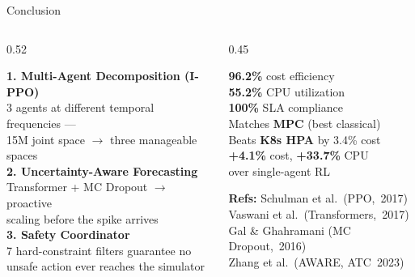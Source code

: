 \documentclass[aspectratio=169,10pt]{beamer}
\begin{document}
\begin{frame}{Conclusion}
\begin{columns}[T]
\begin{column}{0.52\textwidth}
\begin{tcolorbox}[mybox, title={Three Contributions}]
\small
\textbf{1. Multi-Agent Decomposition (I-PPO)}\\
\footnotesize 3 agents at different temporal frequencies ---\\
15M joint space $\to$ three manageable spaces\\[5pt]
\small \textbf{2. Uncertainty-Aware Forecasting}\\
\footnotesize Transformer + MC Dropout $\to$ proactive\\
scaling before the spike arrives\\[5pt]
\small \textbf{3. Safety Coordinator}\\
\footnotesize 7 hard-constraint filters guarantee no\\
unsafe action ever reaches the simulator
\end{tcolorbox}
\end{column}
\begin{column}{0.45\textwidth}
\vspace{0.2cm}
\begin{tcolorbox}[accentbox]
\small
\textbf{96.2\%} cost efficiency\\
\textbf{55.2\%} CPU utilization\\
\textbf{100\%} SLA compliance\\[5pt]
Matches \textbf{MPC} (best classical)\\
Beats \textbf{K8s HPA} by 3.4\% cost\\
\textbf{+4.1\%} cost, \textbf{+33.7\%} CPU\\
over single-agent RL
\end{tcolorbox}
\vspace{0.2cm}
\begin{tcolorbox}[warnbox]
\small \textbf{Refs:} Schulman et al.\ (PPO,~2017)\\
Vaswani et al.\ (Transformers,~2017)\\
Gal \& Ghahramani (MC Dropout,~2016)\\
Zhang et al.\ (AWARE, ATC~2023)
\end{tcolorbox}
\end{column}
\end{columns}
\end{frame}
\end{document}
